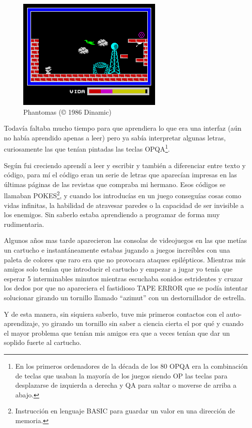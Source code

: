 \begin{figure}[h!]
\centering
\includegraphics{../images/phantomas-sp1}
\caption{Phantomas (© 1986 Dinamic)}
\label{fig:phantomas}
\end{figure}

\bigskip
Todavía faltaba mucho tiempo para que aprendiera lo que era una interfaz (aún no había aprendido apenas a leer) pero ya sabía interpretar algunas letras, curiosamente las que tenían pintadas las teclas OPQA\footnote{En los primeros ordenadores de la década de los 80 OPQA era la combinación de teclas que usaban la mayoría de los juegos siendo OP las teclas para desplazarse de izquierda a derecha y QA para saltar o moverse de arriba a abajo.}.

\bigskip
Según fui creciendo aprendí a leer y escribir y también a diferenciar entre texto y código, para mí el código eran un serie de letras que aparecían impresas en las últimas páginas de las revistas que compraba mi hermano. Esos códigos se llamaban POKES\footnote{Instrucción en lenguaje BASIC para guardar un valor en una dirección de memoria.}, y cuando los introducías en un juego conseguías cosas como vidas infinitas, la habilidad de atravesar paredes o la capacidad de ser invisible a los enemigos. Sin saberlo estaba aprendiendo a programar de forma muy rudimentaria.

\bigskip
Algunos años mas tarde aparecieron las consolas de videojuegos en las que metías un cartucho e instantáneamente estabas jugando a juegos increíbles con una paleta de colores que raro era que no provocara ataques epilépticos. Mientras mis amigos solo tenían que introducir el cartucho y empezar a jugar yo tenía que esperar 5 interminables minutos mientras escuchaba sonidos estridentes y cruzar los dedos por que no apareciera el fastidioso TAPE ERROR que se podía intentar solucionar girando un tornillo llamado ``azimut'' con un destornillador de estrella.

\bigskip
Y de esta manera, sin siquiera saberlo, tuve mis primeros contactos con el auto-aprendizaje, yo girando un tornillo sin saber a ciencia cierta el por qué y cuando el mayor problema que tenían mis amigos era que a veces tenían que dar un soplido fuerte al cartucho.

